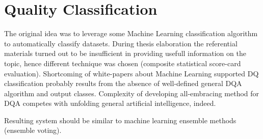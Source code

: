 \chapter{Quality Classification}\label{ch:quality-classification}

The original idea was to leverage some Machine Learning classification algorithm to automatically classify datasets.
During thesis elaboration the referential materials turned out to be insufficient in providing usefull information on the topic, hence different technique was chosen (composite statistical score-card evaluation).
Shortcoming of white-papers about Machine Learning supported DQ classification probably results from the absence of well-defined general DQA algorithm and output classes.
Complexity of developing all-embracing method for DQA competes with unfolding general artificial intelligence, indeed.

Resulting system should be similar to machine learning ensemble methods (ensemble voting).
